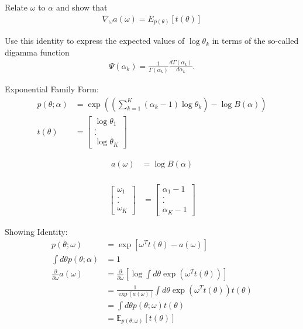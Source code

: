\documentclass [12pt]{article}
\begin{document}
\begin{itemize}
Relate $\omega$ to $\alpha$ and show that 
\begin{align*}
	\nabla_\omega a(\omega) = E_{p(\theta)}[t(\theta)]
\end{align*}



Use this identity to express the expected values of $\log \theta_k$ in terms of the so-called digamma function\textbf{} 
\begin{align*}
	\Psi(\alpha_k) = \frac{1}{\Gamma(\alpha_k)} \frac{d \Gamma(\alpha_k)}{d \alpha_k}.
\end{align*}

Exponential Family Form:
\begin{align*}
    p(\theta; \alpha) &= \exp{ \left( \left( \sum_{k=1}^K (\alpha_k -1 ) \log \theta_k\right) - \log B(\alpha) \right)}\\
    t(\theta) &= \begin{bmatrix} \log{\theta_1} \\.\\.\\ \log{\theta_K}\end{bmatrix}
\end{align*}


\begin{align*}
    a(\omega) &= \log B(\alpha) \\
\end{align*}

\begin{align*}
        \begin{bmatrix} \omega_1 \\ . \\ . \\ \omega_K \end{bmatrix} &= \begin{bmatrix} \alpha_1 -1 \\ . \\ . \\ \alpha_K -1\end{bmatrix}
\end{align*}

Showing Identity:
\begin{align*}
    p(\theta;\omega) 
        &= \exp\left[ \omega^T t(\theta) - a(\omega)\right]\\
    \int d\theta p(\theta ; \alpha) 
        &= 1 \\
    \frac{\partial}{\partial \omega} a(\omega) 
        &= \frac{\partial}{\partial \omega} \left[\log \int d\theta \exp \left(\omega^T t(\theta) \right)\right]\\
        &= \frac{1}{\exp\left[ a(\omega)\right]} \int d\theta \exp \left(\omega^T t(\theta)\right) t(\theta) \\
        &= \int d\theta p(\theta;\omega) t(\theta) \\
        &= \mathbb{E}_{p(\theta;\omega)}\left[t(\theta)\right] 
\end{align*}


\end{itemize}
\end{document}
